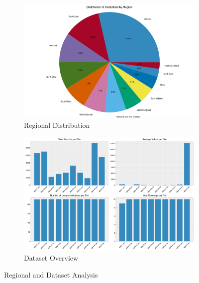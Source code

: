\documentclass[journal,onecolumn, 10pt,draftclsnofoot]{IEEEtran}
\begin{document}
\begin{figure}[h]
    \centering
    \begin{subfigure}[b]{0.48\textwidth}
        \centering
        \includegraphics[width=\linewidth]{Fig/figure45.regional_distribution_pie.png}
        \caption{Regional Distribution}
        \label{fig:regional-distribution}
    \end{subfigure}
    \hfill
    \begin{subfigure}[b]{0.48\textwidth}
        \centering
        \includegraphics[width=\linewidth]{Fig/figure46.dataset_overview.png}
        \caption{Dataset Overview}
        \label{fig:dataset-overview}
    \end{subfigure}
    \vspace{0.6cm}
    \caption{Regional and Dataset Analysis}
    \label{fig:regional-dataset}
\end{figure}




\clearpage


\end{document}
